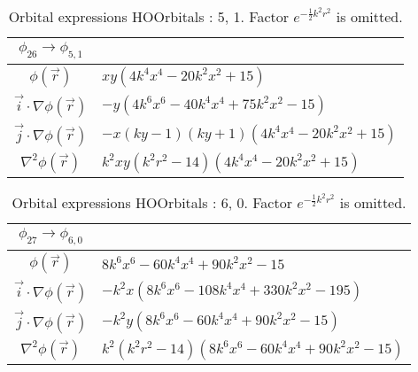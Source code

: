 \begin{table}
\begin{center}
\begin{tabular}{c|l}
$\phi_{26} \rightarrow \phi_{5, 1}$\\
\hline
$\phi(\vec r)$ & $x y \left(4 k^{4} x^{4} - 20 k^{2} x^{2} + 15\right)$\\
\hline
$\vec i\cdot \nabla \phi(\vec r)$ & $- y \left(4 k^{6} x^{6} - 40 k^{4} x^{4} + 75 k^{2} x^{2} -15\right)$\\
$\vec j\cdot \nabla \phi(\vec r)$ & $- x \left(k y -1\right) \left(k y + 1\right) \left(4 k^{4} x^{4} - 20 k^{2} x^{2} + 15\right)$\\
\hline
$\nabla^2 \phi(\vec r)$ & $k^{2} x y \left(k^{2} r^{2} -14\right) \left(4 k^{4} x^{4} - 20 k^{2} x^{2} + 15\right)$\\
\end{tabular}
\caption{Orbital expressions HOOrbitals : 5, 1. Factor $e^{- \frac{1}{2} k^{2} r^{2}}$ is omitted.}
\end{center}
\end{table}


\begin{table}
\begin{center}
\begin{tabular}{c|l}
$\phi_{27} \rightarrow \phi_{6, 0}$\\
\hline
$\phi(\vec r)$ & $8 k^{6} x^{6} - 60 k^{4} x^{4} + 90 k^{2} x^{2} -15$\\
\hline
$\vec i\cdot \nabla \phi(\vec r)$ & $- k^{2} x \left(8 k^{6} x^{6} - 108 k^{4} x^{4} + 330 k^{2} x^{2} -195\right)$\\
$\vec j\cdot \nabla \phi(\vec r)$ & $- k^{2} y \left(8 k^{6} x^{6} - 60 k^{4} x^{4} + 90 k^{2} x^{2} -15\right)$\\
\hline
$\nabla^2 \phi(\vec r)$ & $k^{2} \left(k^{2} r^{2} -14\right) \left(8 k^{6} x^{6} - 60 k^{4} x^{4} + 90 k^{2} x^{2} -15\right)$\\
\end{tabular}
\caption{Orbital expressions HOOrbitals : 6, 0. Factor $e^{- \frac{1}{2} k^{2} r^{2}}$ is omitted.}
\end{center}
\end{table}
